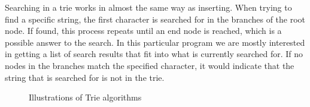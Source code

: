 \newline
Searching in a trie works in almost the same way as inserting. When trying to find a specific string, the first character is searched for in the branches of the root node. If found, this process repeats until an end node is reached, which is a possible answer to the search. In this particular program we are mostly interested in getting a list of search results that fit into what is currently searched for. If no nodes in the branches match the specified character, it would indicate that the string that is searched for is not in the trie.
\begin{figure}[ht]%
  \centering
  \label{Trie/flowdiagram}%
  \caption{Illustrations of Trie algorithms}
\end{figure}
